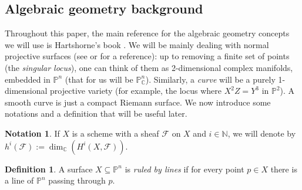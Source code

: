 \documentclass[11pt]{article} %
\theoremstyle{definition}
\newtheorem{definition}[theorem]{Definition}
\newtheorem{notation}[theorem]{Notation}
\begin{document}
\subsection{Algebraic geometry background}\label{subsection_ag}


Throughout this paper, the main reference for the algebraic geometry concepts we will use is Hartshorne's book \cite{Hart}.
We will be mainly dealing with normal projective surfaces (see \cite{Bea} or \cite[Chapter V]{Hart} for a reference): up to removing a finite set of points (the \emph{singular locus}), one can think of them as 2-dimensional complex manifolds, embedded in $\mathbb{P}^n$ (that for us will be $\mathbb{P}^n_{\mathbb{C}}$). Similarly, a \emph{curve} will be a purely 1-dimensional projective variety (for example, the locus where $X^2Z = Y^3$ in $\mathbb{P}^2$). A smooth curve is just a compact Riemann surface. We now introduce some notations and a definition that will be useful later.

\begin{notation}
If $X$ is a scheme with a sheaf $\mathcal{F}$ on $X$ and $i\in \mathbb{N}$, we will denote by $h^i(\mathcal{F}):=\operatorname{dim}_{\mathbb{C}}(H^i(X,\mathcal{F}))$.
\end{notation}
\begin{definition}
A surface $X\subseteq \mathbb{P}^n$ is \textit{ruled by lines} if for every point $p\in X$ there is a line of $\mathbb{P}^n$ passing through $p$.
\end{definition}
\end{document}
